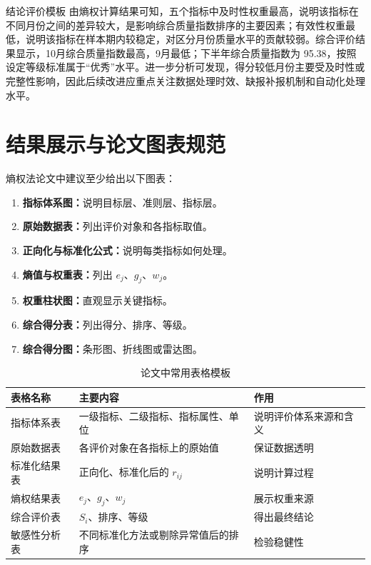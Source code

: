 \documentclass[UTF8,a4paper,12pt]{ctexart}
\begin{document}
\begin{methodbox}{结论评价模板}
由熵权计算结果可知，五个指标中及时性权重最高，说明该指标在不同月份之间的差异较大，是影响综合质量指数排序的主要因素；有效性权重最低，说明该指标在样本期内较稳定，对区分月份质量水平的贡献较弱。综合评价结果显示，10月综合质量指数最高，9月最低；下半年综合质量指数为 95.38，按照设定等级标准属于“优秀”水平。进一步分析可发现，得分较低月份主要受及时性或完整性影响，因此后续改进应重点关注数据处理时效、缺报补报机制和自动化处理水平。
\end{methodbox}

\section{结果展示与论文图表规范}

熵权法论文中建议至少给出以下图表：

\begin{enumerate}
  \item \textbf{指标体系图：}说明目标层、准则层、指标层。
  \item \textbf{原始数据表：}列出评价对象和各指标取值。
  \item \textbf{正向化与标准化公式：}说明每类指标如何处理。
  \item \textbf{熵值与权重表：}列出 $e_j$、$g_j$、$w_j$。
  \item \textbf{权重柱状图：}直观显示关键指标。
  \item \textbf{综合得分表：}列出得分、排序、等级。
  \item \textbf{综合得分图：}条形图、折线图或雷达图。
\end{enumerate}

\begin{table}[H]
\centering
\caption{论文中常用表格模板}
\begin{tabular}{p{3.0cm}p{6.1cm}p{5.0cm}}
\toprule
表格名称 & 主要内容 & 作用\\
\midrule
指标体系表 & 一级指标、二级指标、指标属性、单位 & 说明评价体系来源和含义\\
原始数据表 & 各评价对象在各指标上的原始值 & 保证数据透明\\
标准化结果表 & 正向化、标准化后的 $r_{ij}$ & 说明计算过程\\
熵权结果表 & $e_j$、$g_j$、$w_j$ & 展示权重来源\\
综合评价表 & $S_i$、排序、等级 & 得出最终结论\\
敏感性分析表 & 不同标准化方法或剔除异常值后的排序 & 检验稳健性\\
\bottomrule
\end{tabular}
\end{table}
\end{document}
